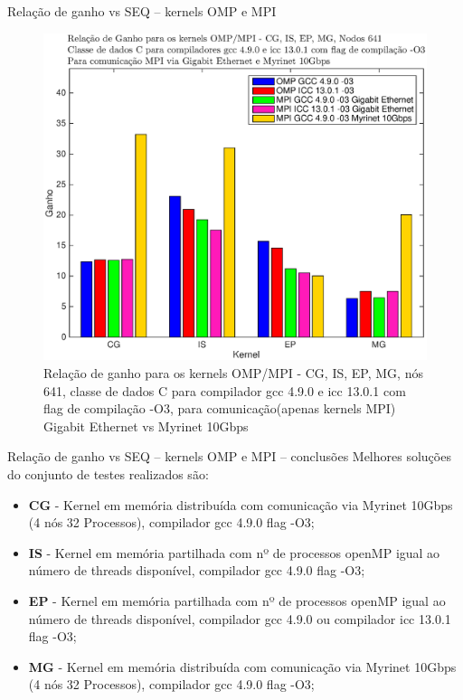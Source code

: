 \documentclass{beamer}
\begin{document}
\begin{frame}{ Relação de ganho vs SEQ  -- kernels OMP e MPI }



\begin{figure}[H]
\centering
\includegraphics[width=0.75\columnwidth]{EPS/MPI/641/ganho_mpi_omp_vs_seq_641.eps}
\caption{\tiny Relação de ganho para os kernels OMP/MPI - CG, IS, EP, MG, nós 641, classe de dados C para compilador gcc 4.9.0 e icc 13.0.1 com flag de compilação  -O3, para comunicação(apenas kernels MPI) Gigabit Ethernet vs Myrinet 10Gbps}
\label{ganhos_todos_641}
\end{figure}
\end{frame}



\begin{frame}{ Relação de ganho vs SEQ  -- kernels OMP e MPI -- conclusões}
Melhores soluções do conjunto de testes realizados são:
\begin{itemize}
\item \textbf{CG} - Kernel em memória distribuída com comunicação via Myrinet 10Gbps (4 nós 32 Processos), compilador gcc 4.9.0 flag -O3;
\item \textbf{IS} - Kernel em memória partilhada com nº de processos openMP igual ao número de threads disponível, compilador gcc 4.9.0 flag -O3;
\item \textbf{EP} - Kernel em memória partilhada com nº de processos openMP igual ao número de threads disponível, compilador gcc 4.9.0 ou compilador icc 13.0.1 flag -O3;
\item \textbf{MG} - Kernel em memória distribuída com comunicação via Myrinet 10Gbps (4 nós 32 Processos), compilador gcc 4.9.0 flag -O3;

\end{itemize}
\end{frame}
\end{document}
